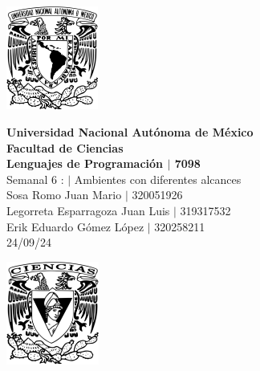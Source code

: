 \begin{center}
    \begin{minipage}{3cm}
    	\begin{center}
    		\includegraphics[height=3.4cm]{src/Img/Logo_UNAM.png}
    	\end{center}
    \end{minipage}\hfill
    \begin{minipage}{10cm}
    	\begin{center}
    	\textbf{\large Universidad Nacional Autónoma de México}\\[0.1cm]
        \textbf{Facultad de Ciencias}\\[0.1cm]
        \textbf{Lenguajes de Programación  $|$ 7098}\\[0.1cm]
        Semanal 6 : $|$ Ambientes con diferentes alcances\\[0.1cm]
        Sosa Romo Juan Mario $|$ 320051926 \\[0.1cm]
        Legorreta Esparragoza Juan Luis $|$ 319317532 \\[0.1cm]
        Erik Eduardo Gómez López $|$ 320258211 \\[0.1cm]
        24/09/24
    	\end{center}
    \end{minipage}\hfill
    \begin{minipage}{3cm}
    	\begin{center}
    		\includegraphics[height=3.4cm]{src/Img/Logo_FC.png}
    	\end{center}
    \end{minipage}
\end{center}

